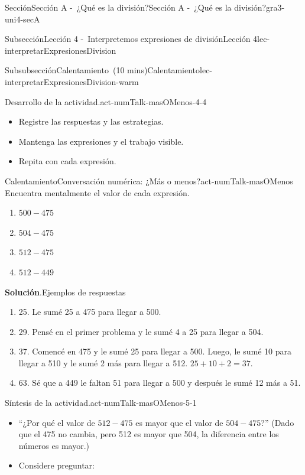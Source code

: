 \documentclass[oneside,10pt,]{article}
\newcommand{\blocktitlefont}{\relax}
\begin{document}
\begin{sectionptx}{Sección}{Sección A -~¿Qué es la división?}{}{Sección A -~¿Qué es la división?}{}{}{gra3-uni4-secA}
\begin{subsectionptx}{Subsección}{Lección 4 -~Interpretemos expresiones de división}{}{Lección 4}{}{}{lec-interpretarExpresionesDivision}
\begin{subsubsectionptx}{Subsubsección}{Calentamiento~(10 mins)}{}{Calentamiento}{}{}{lec-interpretarExpresionesDivision-warm}
\begin{paragraphs}{Desarrollo de la actividad.}{act-numTalk-masOMenos-4-4}%
%
\begin{itemize}[label=\textbullet]
\item{}Registre las respuestas y las estrategias.%
\item{}Mantenga las expresiones y el trabajo visible.%
\item{}Repita con cada expresión.%
\end{itemize}
\end{paragraphs}%
\begin{exploration}{Calentamiento}{Conversación numérica: ¿Más o menos?}{act-numTalk-masOMenos}%
Encuentra mentalmente el valor de cada expresión.%
%
\begin{enumerate}[label={\Alph*.}]
\item{}\(\displaystyle 500 - 475\)%
\item{}\(\displaystyle 504 - 475\)%
\item{}\(\displaystyle 512 - 475\)%
\item{}\(\displaystyle 512 - 449\)%
\end{enumerate}
\par\smallskip%
\noindent\textbf{\blocktitlefont Solución}.\hypertarget{act-numTalk-masOMenos-3}{}\quad{}Ejemplos de respuestas%
\par
%
\begin{enumerate}[label={\Alph*.}]
\item{}25. Le sumé 25 a 475 para llegar a 500.%
\item{}29. Pensé en el primer problema y le sumé 4 a 25 para llegar a 504.%
\item{}37. Comencé en 475 y le sumé 25 para llegar a 500. Luego, le sumé 10 para llegar a 510 y le sumé 2 más para llegar a 512. \(25 + 10 + 2 = 37\).%
\item{}63. Sé que a 449 le faltan 51 para llegar a 500 y después le sumé 12 más a 51.%
\end{enumerate}
%
\end{exploration}%
\par
\begin{paragraphs}{Síntesis de la actividad.}{act-numTalk-masOMenos-5-1}%
%
\begin{itemize}[label=\textbullet]
\item{}``¿Por qué el valor de \(512 - 475\) es mayor que el valor de \(504 - 475\)?'' (Dado que el 475 no cambia, pero 512 es mayor que 504, la diferencia entre los números es mayor.)%
\item{}Considere preguntar:%

\end{itemize}
\end{paragraphs}
\end{subsubsectionptx}
\end{subsectionptx}
\end{sectionptx}
\end{document}
